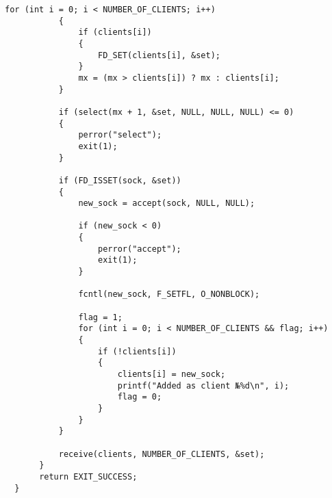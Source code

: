 \documentclass[a4paper,14pt]{extreport} %
\begin{document}
\begin{lstlisting}[caption=Код сервера netserver.c]
           for (int i = 0; i < NUMBER_OF_CLIENTS; i++)
           {
               if (clients[i])
               {
                   FD_SET(clients[i], &set);
               }
               mx = (mx > clients[i]) ? mx : clients[i];
           }

           if (select(mx + 1, &set, NULL, NULL, NULL) <= 0)
           {
               perror("select");
               exit(1);
           }
    
           if (FD_ISSET(sock, &set))
           {
               new_sock = accept(sock, NULL, NULL);

               if (new_sock < 0)
               {
                   perror("accept");
                   exit(1);
               }
               
               fcntl(new_sock, F_SETFL, O_NONBLOCK);

               flag = 1;
               for (int i = 0; i < NUMBER_OF_CLIENTS && flag; i++)
               {
                   if (!clients[i])
                   {
                       clients[i] = new_sock;
                       printf("Added as client №%d\n", i);
                       flag = 0;
                   }
               }
           }

           receive(clients, NUMBER_OF_CLIENTS, &set);
       }
       return EXIT_SUCCESS;
  }
\end{lstlisting}
\end{document}
